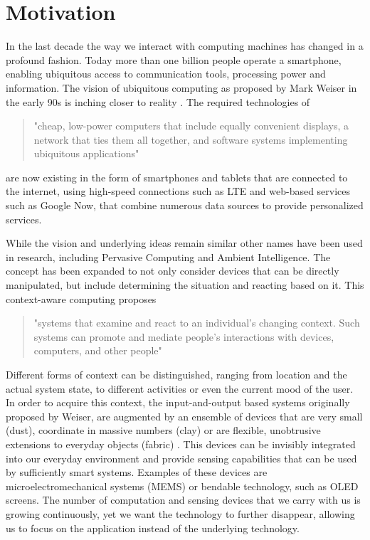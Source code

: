 \section{Motivation}
In the last decade the way we interact with computing machines has changed in a profound fashion. Today more than one billion people operate a smartphone, enabling ubiquitous access to communication tools, processing power and information. The vision of ubiquitous computing as proposed by Mark Weiser in the early 90s is inching closer to reality \cite{Weiser1991}. The required technologies of \begin{quote}
"cheap, low-power computers that include equally convenient displays, a network that ties them all together, and software systems implementing ubiquitous applications" 
\end{quote}
are now existing in the form of smartphones and tablets that are connected to the internet, using high-speed connections such as LTE and web-based services such as Google Now, that combine numerous data sources to provide personalized services.

While the vision and underlying ideas remain similar other names have been used in research, including Pervasive Computing and Ambient Intelligence. The concept has been expanded to not only consider devices that can be directly manipulated, but include determining the situation and reacting based on it. This context-aware computing proposes 
\begin{quote}
"systems that examine and react to an individual's changing context. Such systems can promote and mediate people's interactions with devices, computers, and other people" \cite{schilit1994context} 
\end{quote}
Different forms of context can be distinguished, ranging from location and the actual system state, to different activities or even the current mood of the user. In order to acquire this context, the input-and-output based systems originally proposed by Weiser, are augmented by an ensemble of devices that are very small (dust), coordinate in massive numbers (clay) or are flexible, unobtrusive extensions to everyday objects (fabric) \cite{poslad2011ubiquitous}. This devices can be invisibly integrated into our everyday environment and provide sensing capabilities that can be used by sufficiently smart systems. Examples of these devices are microelectromechanical systems (MEMS) or bendable technology, such as OLED screens. The number of computation and sensing devices that we carry with us is growing continuously, yet we want the technology to further disappear, allowing us to focus on the application instead of the underlying technology. 

